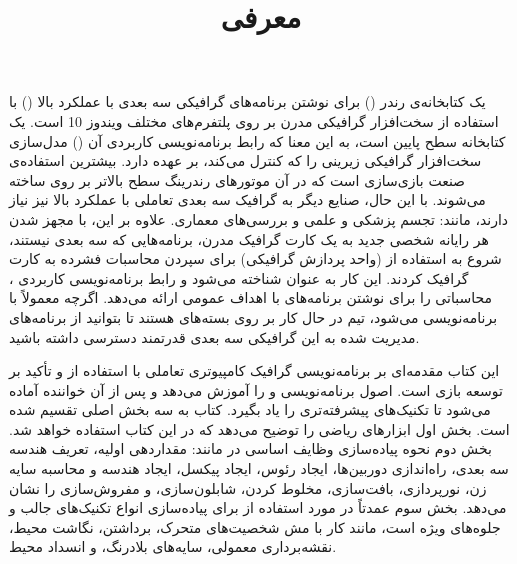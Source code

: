 \textbf{\vspace{80pt}}
\title{
    \BTitr
    \Huge
    \hspace{-40pt}
    \begin{flushright}
        معرفی
    \end{flushright}
}
\textbf{\vspace{80pt}}

{
    \Large
    \begin{spacing}{1.5}
         یک کتابخانه‌ی رندر () برای نوشتن برنامه‌های گرافیکی سه بعدی با عملکرد بالا () با استفاده از سخت‌افزار گرافیکی مدرن بر روی پلتفرم‌های مختلف ویندوز 10  است.
         یک کتابخانه سطح پایین است، به این معنا که رابط برنامه‌نویسی کاربردی آن () مدل‌سازی سخت‌افزار گرافیکی زیرینی را که کنترل می‌کند، بر عهده دارد.
        بیشترین استفاده‌ی  صنعت بازی‌سازی است که در آن موتور‌های رندرینگ سطح بالاتر بر روی  ساخته می‌شوند.
        با این حال، صنایع دیگر به گرافیک سه بعدی تعاملی با عملکرد بالا نیز نیاز دارند، مانند: تجسم پزشکی و علمی و بررسی‌های معماری.
        علاوه بر این، با مجهز شدن هر رایانه شخصی جدید به یک کارت گرافیک مدرن، برنامه‌هایی که سه بعدی نیستند، شروع به استفاده از  (واحد پردازش گرافیکی) برای سپردن محاسبات فشرده به کارت گرافیک کردند.
        این کار به عنوان  شناخته می‌شود و رابط برنامه‌نویسی کاربردی ،  محاسباتی را برای نوشتن برنامه‌های  با اهداف عمومی ارائه می‌دهد.
        اگرچه  معمولاً با  برنامه‌نویسی می‌شود، تیم  در حال کار بر روی بسته‌های  هستند تا بتوانید از برنامه‌های مدیریت شده به این  گرافیکی سه بعدی قدرتمند دسترسی داشته باشید.
    \end{spacing}
}
{
    \Large
    \begin{spacing}{1.5}
        این کتاب مقدمه‌ای بر برنامه‌نویسی گرافیک کامپیوتری تعاملی با استفاده از  و تأکید بر توسعه بازی است. اصول برنامه‌نویسی  و  را آموزش می‌دهد و پس از آن خواننده آماده می‌شود تا تکنیک‌های پیشرفته‌تری را یاد بگیرد.
        کتاب به سه بخش اصلی تقسیم شده است. بخش اول ابزار‌های ریاضی را توضیح می‌دهد که در این کتاب استفاده خواهد شد.
        بخش دوم نحوه پیاده‌سازی وظایف اساسی در  مانند: مقداردهی اولیه، تعریف هندسه سه بعدی، راه‌اندازی دوربین‌ها، ایجاد رئوس، ایجاد پیکسل، ایجاد هندسه و محاسبه سایه زن، نورپردازی، بافت‌سازی، مخلوط کردن، شابلون‌سازی، و مفروش‌سازی را نشان می‌دهد.
        بخش سوم عمدتاً در مورد استفاده از  برای پیاده‌سازی انواع تکنیک‌های جالب و جلوه‌های ویژه است، مانند کار با مش شخصیت‌های متحرک، برداشتن، نگاشت محیط، نقشه‌برداری معمولی، سایه‌های بلادرنگ، و انسداد محیط.
    \end{spacing}
}
